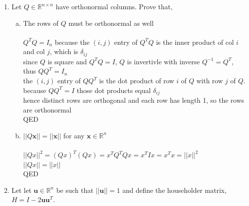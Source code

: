 \documentclass{article}
\begin{document}
{{\begin{enumerate}
\newpage\item Let $Q\in\mathbb{R}^{n\times n}$ have orthonormal columns. Prove that,
\begin{enumerate}[a.]
\item The rows of $Q$ must be orthonormal as well
\\
\\$Q^TQ=I_n$ because the $(i,j)$ entry of $Q^TQ$ is the inner product of col $i$ and col $j$, which is $\delta_{ij}$
\\since $Q$ is square and $Q^TQ=I$, $Q$ is invertivle with inverse $Q^{-1}=Q^T$, thus $QQ^T=I_n$
\\the $(i,j)$ entry of $QQ^T$ is the dot product of row $i$ of $Q$ with row $j$ of $Q$.
\\because $QQ^T=I$ those dot products equal $\delta_{ij}$
\\hence distinct rows are orthogonal and each row has length 1, so the rows are orthonormal
\\QED
\\
\item $||Q{\bm x}||=||{\bm x}||$ for any ${\bm x}\in\mathbb{R}^{n}$
\\
\\$||Qx||^2=(Qx)^T(Qx)=x^TQ^TQx=x^TIx=x^Tx=||x||^2$
\\$||Qx||=||x||$
\\QED
\end{enumerate}

\newpage\item  Let let $\bm{u}\in\mathbb{R}^n$ be such that $||\bm{u}||=1$ and define the householder matrix, $H=I-2\bm{u}\bm{u}^T$. 


\end{enumerate}}}
\end{document}
